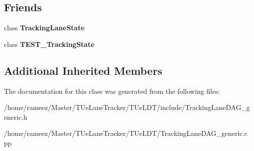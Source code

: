 \subsection*{Friends}
\begin{DoxyCompactItemize}
\item 
\hypertarget{classTrackingLaneDAG__generic_aac458818b6cd604399e29b1702515238}{class {\bfseries Tracking\-Lane\-State}}\label{classTrackingLaneDAG__generic_aac458818b6cd604399e29b1702515238}

\item 
\hypertarget{classTrackingLaneDAG__generic_a3084c090c58f2a0dcf5e638b19d63653}{class {\bfseries T\-E\-S\-T\-\_\-\-Tracking\-State}}\label{classTrackingLaneDAG__generic_a3084c090c58f2a0dcf5e638b19d63653}

\end{DoxyCompactItemize}
\subsection*{Additional Inherited Members}


The documentation for this class was generated from the following files\-:\begin{DoxyCompactItemize}
\item 
/home/rameez/\-Master/\-T\-Ue\-Lane\-Tracker/\-T\-Ue\-L\-D\-T/include/Tracking\-Lane\-D\-A\-G\-\_\-generic.\-h\item 
/home/rameez/\-Master/\-T\-Ue\-Lane\-Tracker/\-T\-Ue\-L\-D\-T/Tracking\-Lane\-D\-A\-G\-\_\-generic.\-cpp\end{DoxyCompactItemize}
